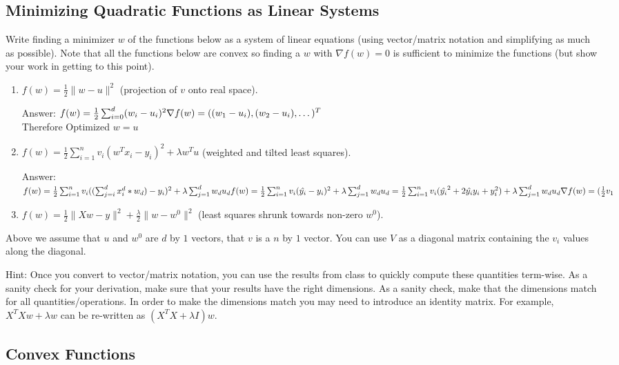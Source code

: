 \documentclass{article}
\def\ans#1{\par\gre{Answer: #1}}
\def\blu#1{{\color{blu}#1}}
\def\gre#1{{\color{gre}#1}}
\def\norm#1{\|#1\|}
\def\enum#1{\begin{enumerate}#1\end{enumerate}}
\begin{document}
\subsection{Minimizing Quadratic Functions as Linear Systems}

Write finding a minimizer $w$ of the functions below as a system of linear equations (using vector/matrix notation and simplifying as much as possible). Note that all the functions below are convex  so finding a $w$ with $\nabla f(w) = 0$ is sufficient to minimize the functions (but show your work in getting to this point).

\blu{\enum{
\item $f(w) = \frac{1}{2}\norm{w-u}^2$ (projection of $v$ onto real space). \ans{ $f(w) = \frac{1}{2}\sum^d_{i=0}(w_i-u_i)^2 \\ \nabla f(w) = ((w_1-u_i), (w_2-u_i), \dots )^T$ \\ Therefore Optimized $w = u$}
\item $f(w)= \frac{1}{2}\sum_{i=1}^n v_i (w^Tx_i - y_i)^2 + \lambda w^Tu$ (weighted and tilted least squares). \ans{$ f(w) = \frac{1}{2}\sum_{i=1}^n v_i( (\sum_{j=i}^d x_i^d * w_d)-y_i )^2 + \lambda \sum_{j=1}^d {w_d}u_d \\ f(w) = \frac{1}{2}\sum_{i=1}^n v_i( \hat{y_i}-y_i )^2 + \lambda \sum_{j=1}^d {w_d}u_d = \frac{1}{2}\sum_{i=1}^n v_i (\hat{y_i}^2 + 2\hat{y_i}{y_i} + y_i^2) + \lambda \sum_{j=1}^d {w_d}u_d \\ \\\nabla f(w) = (\frac{1}{2}v_1$}
\item $f(w) = \frac{1}{2}\norm{Xw - y}^2 + \frac{\lambda}{2}\norm{w-w^0}^2$ (least squares shrunk towards non-zero $w^0$).
}}
Above we assume that $u$ and $w^0$ are $d$ by $1$ vectors, that $v$ is a $n$ by $1$ vector. You can use $V$ as a diagonal matrix containing the $v_i$ values along the diagonal.

Hint: Once you convert to vector/matrix notation, you can use the results from class to quickly compute these quantities term-wise.
As a sanity check for your derivation, make sure that your results have the right dimensions. As a sanity check, make that the dimensions match for all quantities/operations. In order to make the dimensions match you may need to introduce an identity matrix. For example, $X^TXw + \lambda w$ can be re-written as $(X^TX + \lambda I)w$.



\subsection{Convex Functions}
\end{document}
